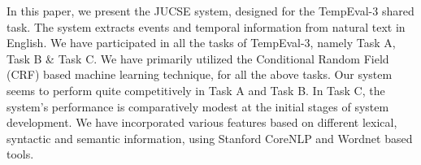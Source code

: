 In this paper, we present the JUCSE system, designed for the TempEval-3 shared task. The system extracts events and temporal information from natural text in
 English. We have participated in all the tasks of TempEval-3, namely Task A,
 Task B \& Task C. We have primarily utilized the Conditional Random Field (CRF)
 based machine learning technique, for all the above tasks. Our system seems to
 perform quite competitively in Task A and Task B. In Task C, the system's
 performance is comparatively modest at the initial stages of system
 development. We have incorporated various features based on different lexical,
 syntactic and semantic information, using Stanford CoreNLP and Wordnet based
 tools.

